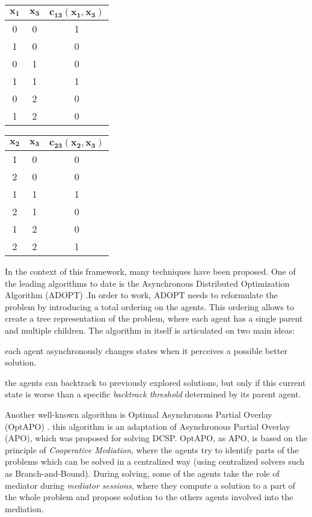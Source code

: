 \begin{center}
\begin{tabular}{ccc}
\toprule
$\boldsymbol{x_1}$	& $\boldsymbol{x_3}$ & $\boldsymbol{c_{13}(x_1,x_3)}$\\
\midrule
0   & 0	& 1\\
1   & 0	& 0\\
0   & 1	& 0\\
1   & 1	& 1\\
0   & 2	& 0\\
1   & 2	& 0\\
\bottomrule
\end{tabular}
\quad
\begin{tabular}{ccc}
\toprule
$\boldsymbol{x_2}$	& $\boldsymbol{x_3}$ & $\boldsymbol{c_{23}(x_2,x_3)}$\\
\midrule
1   & 0	& 0\\
2   & 0	& 0\\
1   & 1	& 1\\
2   & 1	& 0\\
1   & 2	& 0\\
2   & 2	& 1\\
\bottomrule
\end{tabular}
\end{center}

In the context of this framework, many techniques have been proposed. One of the leading algorithms to date is the Asynchronous Distributed Optimization Algorithm (ADOPT) \cite{Modi06adopt:asynchronous}.In order to work, ADOPT needs to reformulate the problem by introducing a total ordering on the agents. This ordering allows to create a tree representation of the problem, where each agent has a single parent and multiple children. The algorithm in itself is articulated on two main ideas:

\begin{compactitem}
\item each agent asynchronously changes states when it perceives a possible better solution.
\item the agents can backtrack to previously explored solutions, but only if this current state is worse than a specific \emph{backtrack threshold} determined by its parent agent.
\end{compactitem}

Another well-known algorithm is Optimal Asynchronous Partial Overlay (OptAPO) \cite{Mailler-355}. this algorithm is an adaptation of Asynchronous Partial Overlay (APO), which was proposed for solving DCSP. OptAPO, as APO, is based on the principle of \emph{Cooperative Mediation}, where the agents try to identify parts of the problems which can be solved in a centralized way (using centralized solvers such as Branch-and-Bound). During solving, some of the agents take the role of mediator during \emph{mediator sessions}, where they compute a solution to a part of the whole problem and propose solution to the others agents involved into the mediation.

